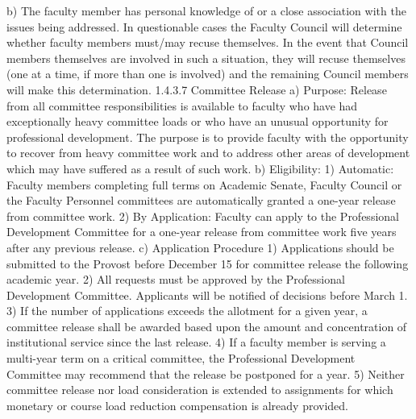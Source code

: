\documentclass[letterpaper, 11pt]{article}
\begin{document}
			b) The faculty member has personal knowledge of or a close association with the issues being addressed.
			In questionable cases the Faculty Council will determine whether faculty members must/may recuse themselves.  In the event that Council members themselves are involved in such a situation, they will recuse themselves (one at a time, if more than one is involved) and the remaining Council members will make this determination.
			1.4.3.7 Committee Release
			a) Purpose:  Release from all committee responsibilities is available to faculty who have had exceptionally heavy committee loads or who have an unusual opportunity for professional development.  The purpose is to provide faculty with the opportunity to recover from heavy committee work and to address other areas of development which may have suffered as a result of such work.
			b) Eligibility:
			1) Automatic:  Faculty members completing full terms on Academic Senate, Faculty Council or the Faculty Personnel committees are automatically granted a one-year release from committee work.
			2) By Application:  Faculty can apply to the Professional Development Committee for a one-year release from committee work five years after any previous release.
			c) Application Procedure
			1) Applications should be submitted to the Provost before December 15 for committee release the following academic year.
			2) All requests must be approved by the Professional Development Committee.  Applicants will be notified of decisions before March 1.
			3) If the number of applications exceeds the allotment for a given year, a committee release shall be awarded based upon the amount and concentration of institutional service since the last release.
			4) If a faculty member is serving a multi-year term on a critical committee, the Professional Development Committee may recommend that the release be postponed for a year.
			5) Neither committee release nor load consideration is extended to assignments for which monetary or course load reduction compensation is already provided.
\end{document}
